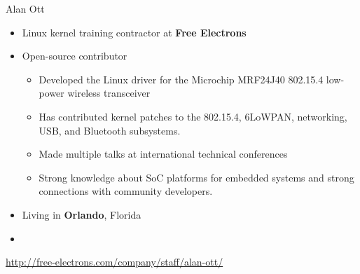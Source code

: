 \begin{frame}{Alan Ott}
    \begin{itemize}
      \item Linux kernel training contractor at {\bf Free Electrons}
      \item Open-source contributor
        \begin{itemize}
	  \item Developed the Linux driver for the Microchip MRF24J40 802.15.4
		low-power wireless transceiver
	  \item Has contributed kernel patches to the 802.15.4, 6LoWPAN,
		networking, USB, and Bluetooth subsystems.
	  \item Made multiple talks at international technical conferences
	  \item Strong knowledge about SoC platforms for embedded
		systems and strong connections with community developers.
        \end{itemize}
      \item Living in {\bf Orlando}, Florida
      \item {}
    \end{itemize}
    {\small \url{http://free-electrons.com/company/staff/alan-ott/}}
\end{frame}

